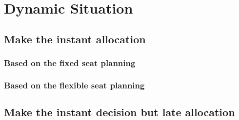 
\section{Dynamic Situation}

\subsection{Make the instant allocation}

\subsubsection{Based on the fixed seat planning}

\subsubsection{Based on the flexible seat planning}

\subsection{Make the instant decision but late allocation}





